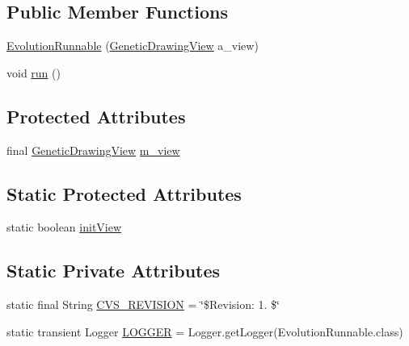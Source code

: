 \subsection*{Public Member Functions}
\begin{DoxyCompactItemize}
\item 
\hyperlink{classexamples_1_1gp_1_1monalisa_1_1gui_1_1_evolution_runnable_a4b57cb3c2faa916062b8b2902e94788e}{Evolution\-Runnable} (\hyperlink{classexamples_1_1gp_1_1monalisa_1_1gui_1_1_genetic_drawing_view}{Genetic\-Drawing\-View} a\-\_\-view)
\item 
void \hyperlink{classexamples_1_1gp_1_1monalisa_1_1gui_1_1_evolution_runnable_a9d3096aba73fd2550d5d723848d2eb74}{run} ()
\end{DoxyCompactItemize}
\subsection*{Protected Attributes}
\begin{DoxyCompactItemize}
\item 
final \hyperlink{classexamples_1_1gp_1_1monalisa_1_1gui_1_1_genetic_drawing_view}{Genetic\-Drawing\-View} \hyperlink{classexamples_1_1gp_1_1monalisa_1_1gui_1_1_evolution_runnable_ae7519fb327e79414e5aba05a38d35d8a}{m\-\_\-view}
\end{DoxyCompactItemize}
\subsection*{Static Protected Attributes}
\begin{DoxyCompactItemize}
\item 
static boolean \hyperlink{classexamples_1_1gp_1_1monalisa_1_1gui_1_1_evolution_runnable_a7a665060162ec68a5d6828250bf07444}{init\-View}
\end{DoxyCompactItemize}
\subsection*{Static Private Attributes}
\begin{DoxyCompactItemize}
\item 
static final String \hyperlink{classexamples_1_1gp_1_1monalisa_1_1gui_1_1_evolution_runnable_a26443b314e22a06c369d6efeae3f5f3c}{C\-V\-S\-\_\-\-R\-E\-V\-I\-S\-I\-O\-N} = \char`\"{}\$Revision\-: 1. \$\char`\"{}
\item 
static transient Logger \hyperlink{classexamples_1_1gp_1_1monalisa_1_1gui_1_1_evolution_runnable_ad06c488241ffaff20e75b1d619dca7e6}{L\-O\-G\-G\-E\-R} = Logger.\-get\-Logger(Evolution\-Runnable.\-class)
\end{DoxyCompactItemize}


